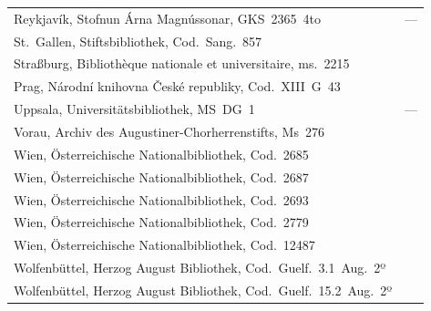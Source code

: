 \noindent
\begin{tabularx}{\linewidth}{@{} >{\raggedright\arraybackslash}X l @{}}
Reykjavík, Stofnun Árna Magnússonar, GKS~2365~4to
	& ---%
	\\
St.~Gallen, Stiftsbibliothek, Cod.~Sang.~857
	& \autocite[1211]{hsc} \\
Straßburg, Bibliothèque nationale et universitaire, ms.~2215
	& \autocite[1828]{hsc} \\
Prag, Národní knihovna České republiky, Cod.~XIII~G~43
	& \autocite[1168]{hsc} \\
Uppsala, Universitätsbibliothek, MS~DG~1
	& ---%
	\\
Vorau, Archiv des Augustiner-Chorherrenstifts, Ms~276
	& \autocite[1432]{hsc} \\
Wien, Österreichische Nationalbibliothek, Cod.~2685
	& \autocite[2013]{hsc} \\
Wien, Österreichische Nationalbibliothek, Cod.~2687
	& \autocite[6494]{hsc} \\
Wien, Österreichische Nationalbibliothek, Cod.~2693
	& \autocite[1215]{hsc} \\
Wien, Österreichische Nationalbibliothek, Cod.~2779
	& \autocite[2693]{hsc} \\
Wien, Österreichische Nationalbibliothek, Cod.~12487
	& \autocite[3394]{hsc} \\
Wolfenbüttel, Herzog August Bibliothek, Cod.~Guelf.~3.1~Aug.~2º
	& \autocite[8396]{hsc} \\
Wolfenbüttel, Herzog August Bibliothek, Cod.~Guelf.~15.2~Aug.~2º
	& \autocite[6668]{hsc} \\
\end{tabularx}
